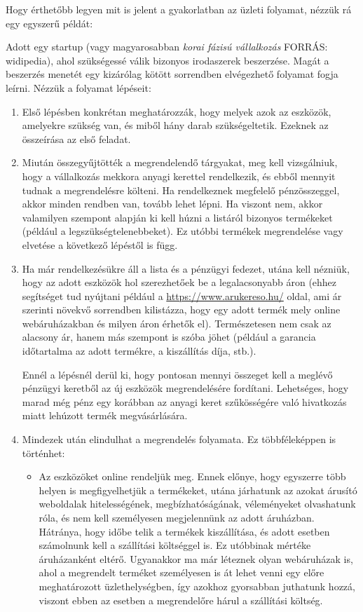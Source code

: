 Hogy érthetőbb legyen mit is jelent a gyakorlatban az üzleti folyamat, nézzük rá egy egyszerű példát:

Adott egy startup (vagy magyarosabban \textit{korai fázisú vállalkozás} FORRÁS: widipedia), ahol szükségessé válik bizonyos irodaszerek beszerzése. Magát a beszerzés menetét egy kizárólag kötött sorrendben elvégezhető folyamat fogja leírni. Nézzük a folyamat lépéseit:

\begin{enumerate}
\item Első lépésben konkrétan meghatározzák, hogy melyek azok az eszközök, amelyekre szükség van, és miből hány darab szükségeltetik. Ezeknek az összeírása az első feladat.

\item Miután összegyűjtötték a megrendelendő tárgyakat, meg kell vizsgálniuk, hogy a vállalkozás mekkora anyagi kerettel rendelkezik, és ebből mennyit tudnak a megrendelésre költeni. Ha rendelkeznek megfelelő pénzösszeggel, akkor minden rendben van, tovább lehet lépni. Ha viszont nem, akkor valamilyen szempont alapján ki kell húzni a listáról bizonyos termékeket (például a legszükségtelenebbeket). Ez utóbbi termékek megrendelése vagy elvetése a következő lépéstől is függ.

\item Ha már rendelkezésükre áll a lista és a pénzügyi fedezet, utána kell nézniük, hogy az adott eszközök hol szerezhetőek be a legalacsonyabb áron (ehhez segítséget tud nyújtani például a \url{https://www.arukereso.hu/} oldal, ami ár szerinti növekvő sorrendben kilistázza, hogy egy adott termék mely online webáruházakban és milyen áron érhetők el). Természetesen nem csak az alacsony ár, hanem más szempont is szóba jöhet (például a garancia időtartalma az adott termékre, a kiszállítás díja, stb.).

Ennél a lépésnél derül ki, hogy pontosan mennyi összeget kell a meglévő pénzügyi keretből az új eszközök megrendelésére fordítani. Lehetséges, hogy marad még pénz egy korábban az anyagi keret szűkösségére való hivatkozás miatt lehúzott termék megvásárlására.

\item Mindezek után elindulhat a megrendelés folyamata. Ez többféleképpen is történhet:

\begin{itemize}
\item Az eszközöket online rendeljük meg. Ennek előnye, hogy egyszerre több helyen is megfigyelhetjük a termékeket, utána járhatunk az azokat árusító weboldalak hitelességének, megbízhatóságának, véleményeket olvashatunk róla, és nem kell személyesen megjelennünk az adott áruházban. Hátránya, hogy időbe telik a termékek kiszállítása, és adott esetben számolnunk kell a szállítási költséggel is. Ez utóbbinak mértéke áruházanként eltérő. Ugyanakkor ma már léteznek olyan webáruházak is, ahol a megrendelt terméket személyesen is át lehet venni egy előre meghatározott üzlethelységben, így azokhoz gyorsabban juthatunk hozzá, viszont ebben az esetben a megrendelőre hárul a szállítási költség.


\end{itemize}
\end{enumerate}
